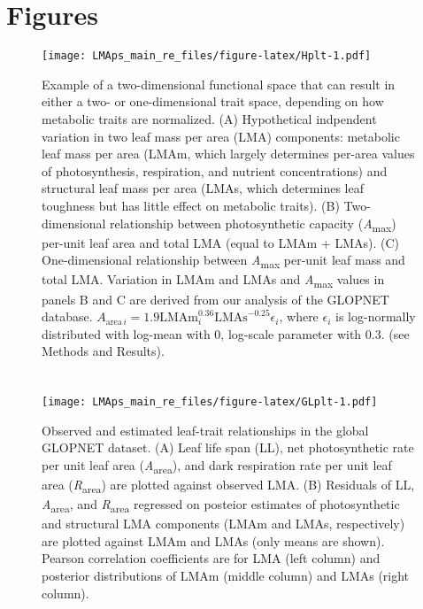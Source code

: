 \documentclass[
  12pt,
]{article}
\begin{document}
\newpage

\hypertarget{figures}{%
\section{Figures}\label{figures}}

\begin{figure}
\centering
\texttt{[image: LMAps\_main\_re\_files/figure-latex/Hplt-1.pdf]}
\caption{\label{fig:Hplt}Example of a two-dimensional functional space that can result in either a two- or one-dimensional trait space, depending on how metabolic traits are normalized. (A) Hypothetical indpendent variation in two leaf mass per area (LMA) components: metabolic leaf mass per area (LMAm, which largely determines per-area values of photosynthesis, respiration, and nutrient concentrations) and structural leaf mass per area (LMAs, which determines leaf toughness but has little effect on metabolic traits). (B) Two-dimensional relationship between photosynthetic capacity (\emph{A}\textsubscript{max}) per-unit leaf area and total LMA (equal to LMAm + LMAs). (C) One-dimensional relationship between \emph{A}\textsubscript{max} per-unit leaf mass and total LMA. Variation in LMAm and LMAs and \emph{A}\textsubscript{max} values in panels B and C are derived from our analysis of the GLOPNET database. \(A_{\mathrm{area} \, i}=1.9\mathrm{LMAm}_i^{0.36}\mathrm{LMAs}^{-0.25}\epsilon_i\), where \(\epsilon_i\) is log-normally distributed with log-mean with 0, log-scale parameter with 0.3. (see Methods and Results).}
\end{figure}

\newpage

\hypertarget{section-2}{%
\section{}\label{section-2}}

\begin{figure}
\centering
\texttt{[image: LMAps\_main\_re\_files/figure-latex/GLplt-1.pdf]}
\caption{\label{fig:GLplt}Observed and estimated leaf-trait relationships in the global GLOPNET dataset. (A) Leaf life span (LL), net photosynthetic rate per unit leaf area (\emph{A}\textsubscript{area}), and dark respiration rate per unit leaf area (\emph{R}\textsubscript{area}) are plotted against observed LMA. (B) Residuals of LL, \emph{A}\textsubscript{area}, and \emph{R}\textsubscript{area} regressed on posteior estimates of photosynthetic and structural LMA components (LMAm and LMAs, respectively) are plotted against LMAm and LMAs (only means are shown). Pearson correlation coefficients are for LMA (left column) and posterior distributions of LMAm (middle column) and LMAs (right column).}
\end{figure}
\end{document}

